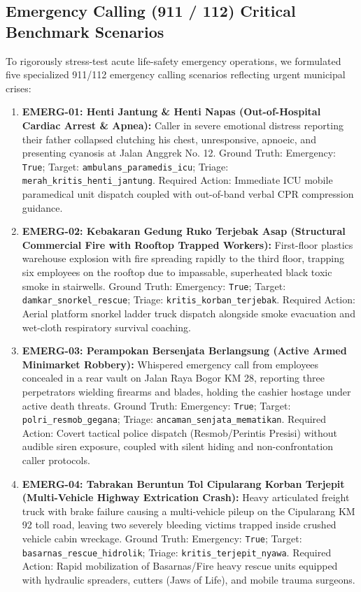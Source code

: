 \documentclass[journal,compsoc]{IEEEtran}
\begin{document}
\subsection{Emergency Calling (911 / 112) Critical Benchmark Scenarios}
To rigorously stress-test acute life-safety emergency operations, we formulated five specialized 911/112 emergency calling scenarios reflecting urgent municipal crises:
\begin{enumerate}
    \item \textbf{EMERG-01: Henti Jantung \& Henti Napas (Out-of-Hospital Cardiac Arrest \& Apnea):} Caller in severe emotional distress reporting their father collapsed clutching his chest, unresponsive, apnoeic, and presenting cyanosis at Jalan Anggrek No. 12. Ground Truth: Emergency: \texttt{True}; Target: \texttt{ambulans\_paramedis\_icu}; Triage: \texttt{merah\_kritis\_henti\_jantung}. Required Action: Immediate ICU mobile paramedical unit dispatch coupled with out-of-band verbal CPR compression guidance.
    \item \textbf{EMERG-02: Kebakaran Gedung Ruko Terjebak Asap (Structural Commercial Fire with Rooftop Trapped Workers):} First-floor plastics warehouse explosion with fire spreading rapidly to the third floor, trapping six employees on the rooftop due to impassable, superheated black toxic smoke in stairwells. Ground Truth: Emergency: \texttt{True}; Target: \texttt{damkar\_snorkel\_rescue}; Triage: \texttt{kritis\_korban\_terjebak}. Required Action: Aerial platform snorkel ladder truck dispatch alongside smoke evacuation and wet-cloth respiratory survival coaching.
    \item \textbf{EMERG-03: Perampokan Bersenjata Berlangsung (Active Armed Minimarket Robbery):} Whispered emergency call from employees concealed in a rear vault on Jalan Raya Bogor KM 28, reporting three perpetrators wielding firearms and blades, holding the cashier hostage under active death threats. Ground Truth: Emergency: \texttt{True}; Target: \texttt{polri\_resmob\_gegana}; Triage: \texttt{ancaman\_senjata\_mematikan}. Required Action: Covert tactical police dispatch (Resmob/Perintis Presisi) without audible siren exposure, coupled with silent hiding and non-confrontation caller protocols.
    \item \textbf{EMERG-04: Tabrakan Beruntun Tol Cipularang Korban Terjepit (Multi-Vehicle Highway Extrication Crash):} Heavy articulated freight truck with brake failure causing a multi-vehicle pileup on the Cipularang KM 92 toll road, leaving two severely bleeding victims trapped inside crushed vehicle cabin wreckage. Ground Truth: Emergency: \texttt{True}; Target: \texttt{basarnas\_rescue\_hidrolik}; Triage: \texttt{kritis\_terjepit\_nyawa}. Required Action: Rapid mobilization of Basarnas/Fire heavy rescue units equipped with hydraulic spreaders, cutters (Jaws of Life), and mobile trauma surgeons.

\end{enumerate}
\end{document}

